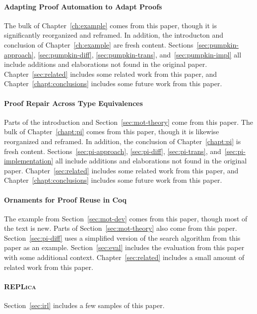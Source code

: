 \paragraph{Adapting Proof Automation to Adapt Proofs}
The bulk of Chapter~\ref{ch:example} comes from this paper,
though it is significantly reorganized and reframed.
In addition, the introducton and conclusion of Chapter~\ref{ch:example} are fresh content.
Sections~\ref{sec:pumpkin-approach}, \ref{sec:pumpkin-diff}, \ref{sec:pumpkin-trans}, and~\ref{sec:pumpkin-impl}
all include additions and elaborations not found in the original paper.
Chapter~\ref{sec:related} includes some related work from this paper,
and Chapter~\ref{chapt:conclusions} includes some future work from this paper.

\paragraph{Proof Repair Across Type Equivalences}
Parts of the introduction and Section~\ref{sec:mot-theory} come from this paper.
The bulk of Chapter~\ref{chapt:pi} comes from this paper,
though it is likewise reorganized and reframed.
In addition, the conclusion of Chapter~\ref{chapt:pi} is fresh content.
Sections~\ref{sec:pi-approach}, \ref{sec:pi-diff}, \ref{sec:pi-trans}, and~\ref{sec:pi-implementation}
all include additions and elaborations not found in the original paper.
Chapter~\ref{sec:related} includes some related work from this paper,
and Chapter~\ref{chapt:conclusions} includes some future work from this paper.

\paragraph{Ornaments for Proof Reuse in Coq}
The example from Section~\ref{sec:mot-dev} comes from this paper, though most of the text is new.
Parts of Section~\ref{sec:mot-theory} also come from this paper.
Section~\ref{sec:pi-diff} uses a simplified version of the search algorithm from this paper as an example.
Section~\ref{sec:eval} includes the evaluation from this paper with some additional context.
Chapter~\ref{sec:related} includes a small amount of related work from this paper.

\paragraph{\textsc{REPLica}}
Section~\ref{sec:irl} includes a few samples of this paper.

